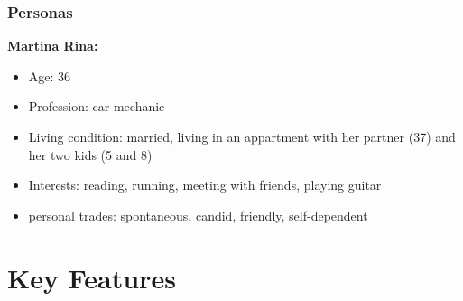 \documentclass[aspectratio=169]{beamer}
\begin{document}
\begin{frame}   
	\frametitle{Personas}{\textbf{Martina Rina:}}
	\begin{itemize}
		\item Age: 36
		\item Profession: car mechanic
		\item Living condition: married, living in an appartment with her partner (37) and her two kids (5 and 8)
		\item Interests: reading, running, meeting with friends, playing guitar 
		\item personal trades: spontaneous, candid, friendly, self-dependent
	\end{itemize}
\end{frame}






\section{Key Features}


\end{document}
